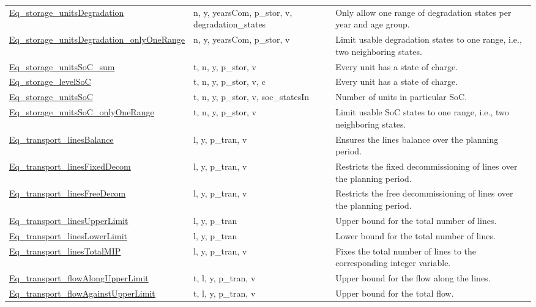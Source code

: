 \documentclass[11pt]{article}
\begin{document}
\begin{tabularx}{\textwidth}{| l | l | X |}
\hyperref[Eq_storage_unitsDegradation]{Eq\_storage\_unitsDegradation}  & n, y, yearsCom, p\_stor, v, degradation\_states & Only allow one range of degradation states per year and age group. \\ 
\hyperref[Eq_storage_unitsDegradation_onlyOneRange]{Eq\_storage\_unitsDegradation\_onlyOneRange}  & n, y, yearsCom, p\_stor, v & Limit usable degradation states to one range, i.e., two neighboring states. \\ 
\hyperref[Eq_storage_unitsSoC_sum]{Eq\_storage\_unitsSoC\_sum}  & t, n, y, p\_stor, v & Every unit has a state of charge. \\ 
\hyperref[Eq_storage_levelSoC]{Eq\_storage\_levelSoC}  & t, n, y, p\_stor, v, c & Every unit has a state of charge. \\ 
\hyperref[Eq_storage_unitsSoC]{Eq\_storage\_unitsSoC}  & t, n, y, p\_stor, v, soc\_statesIn & Number of units in particular SoC. \\ 
\hyperref[Eq_storage_unitsSoC_onlyOneRange]{Eq\_storage\_unitsSoC\_onlyOneRange}  & t, n, y, p\_stor, v & Limit usable SoC states to one range, i.e., two neighboring states. \\ 
\hyperref[Eq_transport_linesBalance]{Eq\_transport\_linesBalance}  & l, y, p\_tran, v & Ensures the lines balance over the planning period. \\ 
\hyperref[Eq_transport_linesFixedDecom]{Eq\_transport\_linesFixedDecom}  & l, y, p\_tran, v & Restricts the fixed decommissioning of lines over the planning period. \\ 
\hyperref[Eq_transport_linesFreeDecom]{Eq\_transport\_linesFreeDecom}  & l, y, p\_tran, v & Restricts the free decommissioning of lines over the planning period. \\ 
\hyperref[Eq_transport_linesUpperLimit]{Eq\_transport\_linesUpperLimit}  & l, y, p\_tran & Upper bound for the total number of lines. \\ 
\hyperref[Eq_transport_linesLowerLimit]{Eq\_transport\_linesLowerLimit}  & l, y, p\_tran & Lower bound for the total number of lines. \\ 
\hyperref[Eq_transport_linesTotalMIP]{Eq\_transport\_linesTotalMIP}  & l, y, p\_tran, v & Fixes the total number of lines to the corresponding integer variable. \\ 
\hyperref[Eq_transport_flowAlongUpperLimit]{Eq\_transport\_flowAlongUpperLimit}  & t, l, y, p\_tran, v & Upper bound for the flow along the lines. \\ 
\hyperref[Eq_transport_flowAgainstUpperLimit]{Eq\_transport\_flowAgainstUpperLimit}  & t, l, y, p\_tran, v & Upper bound for the total flow. \\ 

\end{tabularx}
\end{document}
